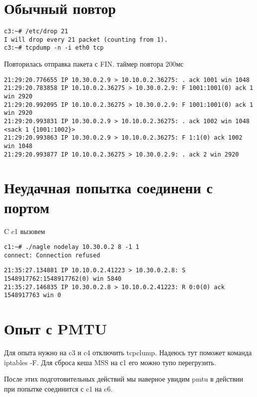 \documentclass[a4paper,12pt]{article}
\begin{document}
\section{Обычный повтор}

\begin{Verbatim}
c3:~# /etc/drop 21
I will drop every 21 packet (counting from 1).
c3:~# tcpdump -n -i eth0 tcp
\end{Verbatim}

Повторилась отправка пакета с FIN. таймер повтора 200мс
\begin{Verbatim}
21:29:20.776655 IP 10.30.0.2.9 > 10.10.0.2.36275: . ack 1001 win 1048 
21:29:20.783858 IP 10.10.0.2.36275 > 10.30.0.2.9: F 1001:1001(0) ack 1 win 2920
21:29:20.992095 IP 10.10.0.2.36275 > 10.30.0.2.9: F 1001:1001(0) ack 1 win 2920
21:29:20.993831 IP 10.30.0.2.9 > 10.10.0.2.36275: . ack 1002 win 1048 <sack 1 {1001:1002}>
21:29:20.993863 IP 10.30.0.2.9 > 10.10.0.2.36275: F 1:1(0) ack 1002 win 1048
21:29:20.993877 IP 10.10.0.2.36275 > 10.30.0.2.9: . ack 2 win 2920
\end{Verbatim}

\section{Неудачная попытка соединени с портом}

C c1 вызовем
\begin{Verbatim}
c1:~# ./nagle nodelay 10.30.0.2 8 -1 1
connect: Connection refused
\end{Verbatim}

\begin{Verbatim}
21:35:27.134881 IP 10.10.0.2.41223 > 10.30.0.2.8: S 1548917762:1548917762(0) win 5840
21:35:27.146835 IP 10.30.0.2.8 > 10.10.0.2.41223: R 0:0(0) ack 1548917763 win 0
\end{Verbatim}

\section{Опыт с PMTU}

Для опыта нужно на c3 и c4 отключить tcpclump.
Надеюсь тут поможет команда iptables -F.
Для сброса кеша MSS на с1 его можно тупо перегрузить.

После этих подготовительных действий мы наверное увидим pmtu в действии при попытке соединится с c1 на c6.
\end{document}
